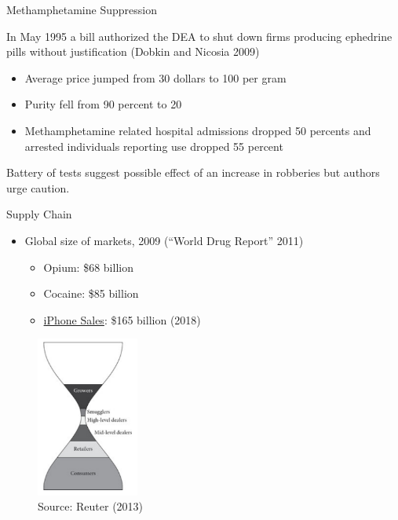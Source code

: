 \documentclass[10pt,ignorenonframetext,]{beamer}
\providecommand{\tightlist}{%
  \setlength{\itemsep}{0pt}\setlength{\parskip}{0pt}}
\begin{document}
\begin{frame}{Methamphetamine Suppression}
\protect\hypertarget{methamphetamine-suppression}{}

In May 1995 a bill authorized the DEA to shut down firms producing
ephedrine pills without justification (Dobkin and Nicosia 2009)

\begin{itemize}
\tightlist
\item
  Average price jumped from 30 dollars to 100 per gram
\item
  Purity fell from 90 percent to 20
\item
  Methamphetamine related hospital admissions dropped 50 percents and
  arrested individuals reporting use dropped 55 percent
\end{itemize}

Battery of tests suggest possible effect of an increase in robberies but
authors urge caution.

\end{frame}

\begin{frame}{Supply Chain}
\protect\hypertarget{supply-chain}{}

\begin{itemize}
\tightlist
\item
  Global size of markets, 2009 (``World Drug Report'' 2011)

  \begin{itemize}
  \tightlist
  \item
    Opium: \$68 billion
  \item
    Cocaine: \$85 billion
  \item
    \href{https://www.statista.com/statistics/263402/apples-iphone-revenue-since-3rd-quarter-2007/}{iPhone
    Sales}: \$165 billion (2018)
  \end{itemize}
\end{itemize}

\begin{figure}
\centering
\includegraphics[width=0.3\textwidth,height=\textheight]{../chicago/figs/Reuter_hourglass.png}
\caption{Source: Reuter (2013)}
\end{figure}

\end{frame}
\end{document}
